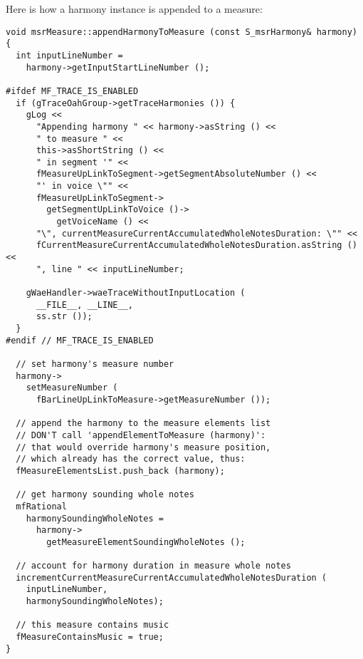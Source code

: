 Here is how a harmony instance is appended to a measure:
\begin{lstlisting}[language=CPlusPlus]
void msrMeasure::appendHarmonyToMeasure (const S_msrHarmony& harmony)
{
  int inputLineNumber =
    harmony->getInputStartLineNumber ();

#ifdef MF_TRACE_IS_ENABLED
  if (gTraceOahGroup->getTraceHarmonies ()) {
    gLog <<
      "Appending harmony " << harmony->asString () <<
      " to measure " <<
      this->asShortString () <<
      " in segment '" <<
      fMeasureUpLinkToSegment->getSegmentAbsoluteNumber () <<
      "' in voice \"" <<
      fMeasureUpLinkToSegment->
        getSegmentUpLinkToVoice ()->
          getVoiceName () <<
      "\", currentMeasureCurrentAccumulatedWholeNotesDuration: \"" <<
      fCurrentMeasureCurrentAccumulatedWholeNotesDuration.asString () <<
      ", line " << inputLineNumber;

    gWaeHandler->waeTraceWithoutInputLocation (
      __FILE__, __LINE__,
      ss.str ());
  }
#endif // MF_TRACE_IS_ENABLED

  // set harmony's measure number
  harmony->
    setMeasureNumber (
      fBarLineUpLinkToMeasure->getMeasureNumber ());

  // append the harmony to the measure elements list
  // DON'T call 'appendElementToMeasure (harmony)':
  // that would override harmony's measure position,
  // which already has the correct value, thus:
  fMeasureElementsList.push_back (harmony);

  // get harmony sounding whole notes
  mfRational
    harmonySoundingWholeNotes =
      harmony->
        getMeasureElementSoundingWholeNotes ();

  // account for harmony duration in measure whole notes
  incrementCurrentMeasureCurrentAccumulatedWholeNotesDuration (
    inputLineNumber,
    harmonySoundingWholeNotes);

  // this measure contains music
  fMeasureContainsMusic = true;
}
\end{lstlisting}

